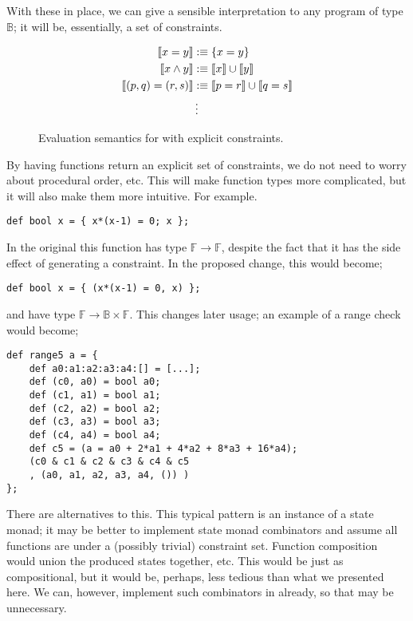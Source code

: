 \documentclass[
    9pt,            
    techreport,       
    affiltop,       
]{art}
\begin{document}
With these in place, we can give a sensible interpretation to any program of type $\mathbb{B}$; it will be, essentially, a set of constraints.

\begin{figure}[H]
\begin{align*}
    \llbracket x = y \rrbracket &:\equiv \{x = y\}\\
    \llbracket x \wedge y \rrbracket &:\equiv \llbracket x\rrbracket \cup \llbracket y\rrbracket\\
    \llbracket (p, q) = (r, s) \rrbracket &:\equiv \llbracket p = r \rrbracket \cup \llbracket q = s \rrbracket\\
    &\,\vdots
\end{align*}
\caption{Evaluation semantics for \VampIR{} with explicit constraints.}
\label{fig:evaluation-semantics}
\end{figure}

By having functions return an explicit set of constraints, we do not need to worry about procedural order, etc. This will make function types more complicated, but it will also make them more intuitive. For example.

\begin{verbatim}
def bool x = { x*(x-1) = 0; x };
\end{verbatim}

In the original \VampIR{} this function has type $\mathbb{F} \rightarrow \mathbb{F}$, despite the fact that it has the side effect of generating a constraint. In the proposed change, this would become;

\begin{verbatim}
def bool x = { (x*(x-1) = 0, x) };
\end{verbatim}

and have type $\mathbb{F} \rightarrow \mathbb{B} \times \mathbb{F}$. This changes later usage; an example of a range check would become;

\begin{verbatim}
def range5 a = {
    def a0:a1:a2:a3:a4:[] = [...];
    def (c0, a0) = bool a0;
    def (c1, a1) = bool a1;
    def (c2, a2) = bool a2;
    def (c3, a3) = bool a3;
    def (c4, a4) = bool a4;
    def c5 = (a = a0 + 2*a1 + 4*a2 + 8*a3 + 16*a4);
    (c0 & c1 & c2 & c3 & c4 & c5
    , (a0, a1, a2, a3, a4, ()) )
};
\end{verbatim}

There are alternatives to this. This typical pattern is an instance of a state monad; it may be better to implement state monad combinators and assume all functions are under a (possibly trivial) constraint set. Function composition would union the produced states together, etc. This would be just as compositional, but it would be, perhaps, less tedious than what we presented here. We can, however, implement such combinators in \VampIR{} already, so that may be unnecessary.
\end{document}
